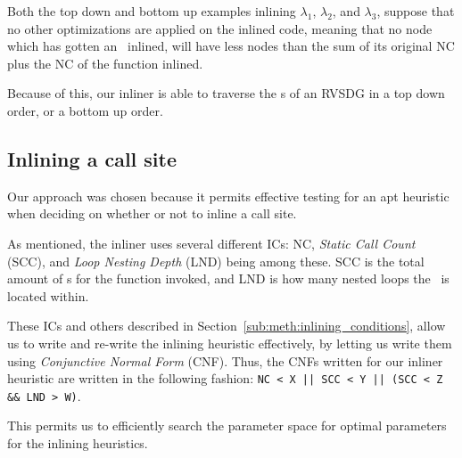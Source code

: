 Both the top down and bottom up examples inlining $\lambda_1$, $\lambda_2$, and
$\lambda_3$, suppose that no other optimizations are applied on the inlined
code, meaning that no node which has gotten an \applyNode~inlined, will have
less nodes than the sum of its original NC plus the NC of the function inlined.

Because of this, our inliner is able to traverse the \applyNode s of an RVSDG in
a top down order, or a bottom up order.

\subsection{Inlining a call site}
\label{sub:scheme:inlining_apply_nodes}

Our approach was chosen because it permits effective testing for an apt
heuristic when deciding on whether or not to inline a call site.

As mentioned, the inliner uses several different ICs: NC, \textit{Static Call
Count} (SCC), and \textit{Loop Nesting Depth} (LND) being among these. SCC is
the total amount of \applyNode s for the function invoked, and LND is how many
nested loops the \applyNode~is located within.

These ICs and others described in Section~\ref{sub:meth:inlining_conditions},
allow us to write and re-write the inlining heuristic effectively, by letting us
write them using \textit{Conjunctive Normal Form} (CNF). Thus, the CNFs written
for our inliner heuristic are written in the following fashion:
\lstinline"NC < X || SCC < Y || (SCC < Z && LND > W)".

This permits us to efficiently search the parameter space for optimal parameters
for the inlining heuristics.

